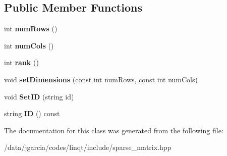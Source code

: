 \subsection*{Public Member Functions}
\begin{DoxyCompactItemize}
\item 
int {\bfseries num\+Rows} ()\hypertarget{class_sparse_matrix_type___b_a_s_e_aca478d5a5a082ee3deb49ac515f71d29}{}\label{class_sparse_matrix_type___b_a_s_e_aca478d5a5a082ee3deb49ac515f71d29}

\item 
int {\bfseries num\+Cols} ()\hypertarget{class_sparse_matrix_type___b_a_s_e_ae92cdc0b9f2c97499f941ec002b8cfc7}{}\label{class_sparse_matrix_type___b_a_s_e_ae92cdc0b9f2c97499f941ec002b8cfc7}

\item 
int {\bfseries rank} ()\hypertarget{class_sparse_matrix_type___b_a_s_e_acefb2ce1679eea7c79f47acfb368aa22}{}\label{class_sparse_matrix_type___b_a_s_e_acefb2ce1679eea7c79f47acfb368aa22}

\item 
void {\bfseries set\+Dimensions} (const int num\+Rows, const int num\+Cols)\hypertarget{class_sparse_matrix_type___b_a_s_e_a177132ea003e9eb4ae5044786c761e82}{}\label{class_sparse_matrix_type___b_a_s_e_a177132ea003e9eb4ae5044786c761e82}

\item 
void {\bfseries Set\+ID} (string id)\hypertarget{class_sparse_matrix_type___b_a_s_e_a76ea4693a656fe0a8d4c234c517886e7}{}\label{class_sparse_matrix_type___b_a_s_e_a76ea4693a656fe0a8d4c234c517886e7}

\item 
string {\bfseries ID} () const \hypertarget{class_sparse_matrix_type___b_a_s_e_a759bbb1277e60b987445e616f532acf5}{}\label{class_sparse_matrix_type___b_a_s_e_a759bbb1277e60b987445e616f532acf5}

\end{DoxyCompactItemize}


The documentation for this class was generated from the following file\+:\begin{DoxyCompactItemize}
\item 
/data/jgarcia/codes/linqt/include/sparse\+\_\+matrix.\+hpp\end{DoxyCompactItemize}
